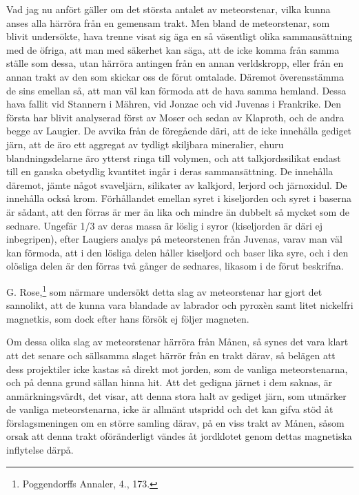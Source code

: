 \documentclass[a4paper, 12pt, oneside, swedish]{article}
\begin{document}
Vad jag nu anfört gäller om det största antalet av meteorstenar, vilka kunna anses alla härröra från en gemensam trakt. Men bland de meteorstenar, som blivit undersökte, hava trenne visat sig äga en så väsentligt olika sammansättning med de öfriga, att man med säkerhet kan säga, att de icke komma från samma ställe som dessa, utan härröra antingen från en annan verldskropp, eller från en annan trakt av den som skickar oss de förut omtalade. Däremot överensstämma de sins emellan så, att man väl kan förmoda att de hava samma hemland. Dessa hava fallit vid Stannern i Mähren, vid Jonzac och vid Juvenas i Frankrike. Den första har blivit analyserad först av Moser och sedan av Klaproth, och de andra begge av Laugier. De avvika från de föregående däri, att de icke innehålla gediget järn, att de äro ett aggregat av tydligt skiljbara mineralier, ehuru blandningsdelarne äro ytterst ringa till volymen, och att talkjordssilikat endast till en ganska obetydlig kvantitet ingår i deras sammansättning. De innehålla däremot, jämte något svaveljärn, silikater av kalkjord, lerjord och järnoxidul. De innehålla också krom. Förhållandet emellan syret i kiseljorden och syret i baserna är sådant, att den förras är mer än lika och mindre än dubbelt så mycket som de sednare. Ungefär 1/3 av deras massa är löslig i syror (kiseljorden är däri ej inbegripen), efter Laugiers analys på meteorstenen från Juvenas, varav man väl kan förmoda, att i den lösliga delen håller kiseljord och baser lika syre, och i den olösliga delen är den förras två gånger de sednares, likasom i de förut beskrifna.

G. Rose,\footnote{Poggendorffs Annaler, 4., 173.} som närmare undersökt detta slag av meteorstenar har gjort det sannolikt, att de kunna vara blandade av labrador och pyroxèn samt litet nickelfri magnetkis, som dock efter hans försök ej följer magneten.

Om dessa olika slag av meteorstenar härröra från Månen, så synes det vara klart att det senare och sällsamma slaget härrör från en trakt därav, så belägen att dess projektiler icke kastas så direkt mot jorden, som de vanliga meteorstenarna, och på denna grund sällan hinna hit. Att det gedigna järnet i dem saknas, är anmärkningsvärdt, det visar, att denna stora halt av gediget järn, som utmärker de vanliga meteorstenarna, icke är allmänt utspridd och det kan gifva stöd åt förslagsmeningen om en större samling därav, på en viss trakt av Månen, såsom orsak att denna trakt oföränderligt vändes åt jordklotet genom dettas magnetiska inflytelse därpå.
\end{document}
